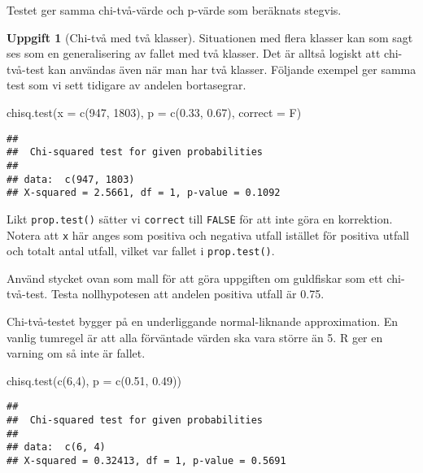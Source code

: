 \documentclass[
]{book}
\newenvironment{Shaded}{\begin{snugshade}}{\end{snugshade}}
\newcommand{\AttributeTok}[1]{\textcolor[rgb]{0.77,0.63,0.00}{#1}}
\newcommand{\DecValTok}[1]{\textcolor[rgb]{0.00,0.00,0.81}{#1}}
\newcommand{\FloatTok}[1]{\textcolor[rgb]{0.00,0.00,0.81}{#1}}
\newcommand{\FunctionTok}[1]{\textcolor[rgb]{0.00,0.00,0.00}{#1}}
\newcommand{\NormalTok}[1]{#1}
\theoremstyle{definition}
\theoremstyle{definition}
\theoremstyle{definition}
\newtheorem{exercise}{Uppgift}[chapter]
\theoremstyle{definition}
\theoremstyle{remark}
\begin{document}
Testet ger samma chi-två-värde och p-värde som beräknats stegvis.

\begin{exercise}[Chi-två med två klasser]
Situationen med flera klasser kan som sagt ses som en generalisering av fallet med två klasser. Det är alltså logiskt att chi-två-test kan användas även när man har två klasser. Följande exempel ger samma test som vi sett tidigare av andelen bortasegrar.

\begin{Shaded}
\begin{Highlighting}[]
\FunctionTok{chisq.test}\NormalTok{(}\AttributeTok{x =} \FunctionTok{c}\NormalTok{(}\DecValTok{947}\NormalTok{, }\DecValTok{1803}\NormalTok{), }\AttributeTok{p =} \FunctionTok{c}\NormalTok{(}\FloatTok{0.33}\NormalTok{, }\FloatTok{0.67}\NormalTok{), }\AttributeTok{correct =}\NormalTok{ F)}
\end{Highlighting}
\end{Shaded}

\begin{verbatim}
## 
##  Chi-squared test for given probabilities
## 
## data:  c(947, 1803)
## X-squared = 2.5661, df = 1, p-value = 0.1092
\end{verbatim}

Likt \texttt{prop.test()} sätter vi \texttt{correct} till \texttt{FALSE} för att inte göra en korrektion. Notera att \texttt{x} här anges som positiva och negativa utfall istället för positiva utfall och totalt antal utfall, vilket var fallet i \texttt{prop.test()}.

Använd stycket ovan som mall för att göra uppgiften om guldfiskar som ett chi-två-test. Testa nollhypotesen att andelen positiva utfall är 0.75.
\end{exercise}

Chi-två-testet bygger på en underliggande normal-liknande approximation. En vanlig tumregel är att alla förväntade värden ska vara större än 5. R ger en varning om så inte är fallet.

\begin{Shaded}
\begin{Highlighting}[]
\FunctionTok{chisq.test}\NormalTok{(}\FunctionTok{c}\NormalTok{(}\DecValTok{6}\NormalTok{,}\DecValTok{4}\NormalTok{), }\AttributeTok{p =} \FunctionTok{c}\NormalTok{(}\FloatTok{0.51}\NormalTok{, }\FloatTok{0.49}\NormalTok{))}
\end{Highlighting}
\end{Shaded}

\begin{verbatim}
## 
##  Chi-squared test for given probabilities
## 
## data:  c(6, 4)
## X-squared = 0.32413, df = 1, p-value = 0.5691
\end{verbatim}
\end{document}
